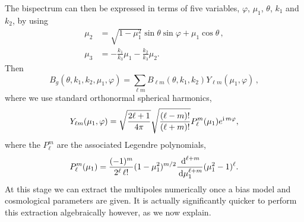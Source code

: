 The bispectrum can then be expressed in terms of five variables, \(\varphi\), \(\mu_1\), \(\theta\), \(k_1\) and \(k_2\), by using
\begin{align}
	\mu_2 &= \sqrt{1-\mu_1^2} \sin\theta \sin\varphi + \mu_1\cos\theta\,,  \\
	\mu_3 &= -\frac{k_1}{k_3}\mu_1 - \frac{k_2}{k_3}\mu_2.
\end{align}
Then 
\begin{equation}\label{eq:bgexpv1}
	B_g(\theta, k_1, k_2, \mu_1, \varphi) = \sum_{\ell m} B_{\ell m}(\theta, k_1, k_2) Y_{\ell m} (\mu_1, \varphi)\,,
\end{equation}
where we use standard orthonormal spherical harmonics,
\begin{equation}
	Y_{\ell m}(\mu_1,\varphi) = \sqrt{\frac{2\ell+1}{4 \pi}} \sqrt{\frac{(\ell-m)!}{(\ell+m)!}} P_\ell^m(\mu_1) e^{{\mathrm{i\,}} m \varphi},
\end{equation}
where the \(P_\ell ^m\) are the associated Legendre polynomials, 
\begin{equation}
	P_\ell ^m(\mu_1) = \frac{(-1)^m}{2^\ell \,\ell !} (1-\mu_1^2)^{m/2} \frac{{\,\mathrm{d}}^{\ell +m}}{{\,\mathrm{d}}\mu_1^{\ell +m}}(\mu_1^2 - 1)^\ell . 
\end{equation}
At this stage we can extract the multipoles numerically once a bias model and cosmological parameters are given. It is actually significantly quicker to perform this extraction algebraically however, as we now explain. 

